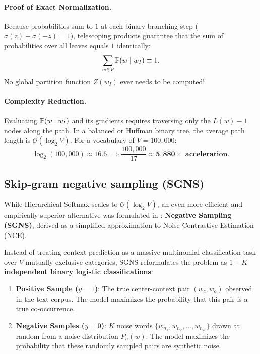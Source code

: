 \documentclass[../../main.tex]{subfiles}
\begin{document}
\paragraph{Proof of Exact Normalization.}
Because probabilities sum to $1$ at each binary branching step ($\sigma(z) + \sigma(-z) = 1$), telescoping products guarantee that the sum of probabilities over all leaves equals $1$ identically:
\begin{equation}
\label{eq:hierarchical_norm_proof}
\sum_{w \in \mathcal{V}} \mathbb{P}(w \mid w_I) \equiv 1.
\end{equation}
No global partition function $Z(w_I)$ ever needs to be computed!

\paragraph{Complexity Reduction.}
Evaluating $\mathbb{P}(w \mid w_I)$ and its gradients requires traversing only the $L(w) - 1$ nodes along the path. In a balanced or Huffman binary tree, the average path length is $\mathcal{O}(\log_2 V)$. For a vocabulary of $V = 100{,}000$:
\begin{equation}
\label{eq:hierarchical_speedup}
\log_2(100{,}000) \approx 16.6 \implies \frac{100{,}000}{17} \approx \mathbf{5{,}880\times \text{ acceleration}}.
\end{equation}

\subsection{Skip-gram negative sampling (SGNS)}
\label{subsec:sgns_formulation}

While Hierarchical Softmax scales to $\mathcal{O}(\log_2 V)$, an even more efficient and empirically superior alternative was formulated in \cite{mikolov2013distributed}: \textbf{Negative Sampling (SGNS)}, derived as a simplified approximation to Noise Contrastive Estimation (NCE).

Instead of treating context prediction as a massive multinomial classification task over $V$ mutually exclusive categories, SGNS reformulates the problem as \textbf{$1 + K$ independent binary logistic classifications}:
\begin{enumerate}
    \item \textbf{Positive Sample ($y = 1$)}: The true center-context pair $(w_c, w_o)$ observed in the text corpus. The model maximizes the probability that this pair is a true co-occurrence.
    \item \textbf{Negative Samples ($y = 0$)}: $K$ noise words $\{w_{n_1}, w_{n_2}, \dots, w_{n_K}\}$ drawn at random from a noise distribution $P_n(w)$. The model maximizes the probability that these randomly sampled pairs are synthetic noise.
\end{enumerate}
\end{document}
